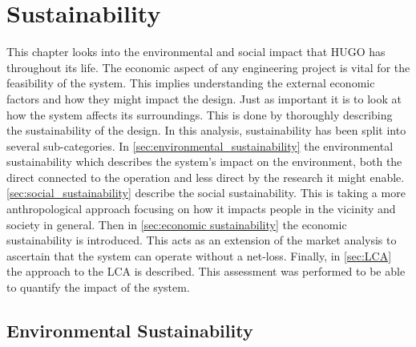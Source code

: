 \chapter{Sustainability}
\label{ch:sustainability}
 This chapter looks into the environmental and social impact that HUGO has throughout its life. The economic aspect of any engineering project is vital for the feasibility of the system. This implies understanding the external economic factors and how they might impact the design. Just as important it is to look at how the system affects its surroundings. This is done by thoroughly describing the sustainability of the design. In this analysis, sustainability has been split into several sub-categories. In \autoref{sec:environmental_sustainability} the environmental sustainability which describes the system's impact on the environment, both the direct connected to the operation and less direct by the research it might enable. \autoref{sec:social_sustainability} describe the social sustainability. This is taking a more anthropological approach focusing on how it impacts people in the vicinity and society in general. Then in \autoref{sec:economic sustainability} the economic sustainability is introduced. This acts as an extension of the market analysis to ascertain that the system can operate without a net-loss. Finally, in \autoref{sec:LCA} the approach to the LCA is described. This assessment was performed to be able to quantify the impact of the system.

 
\section{Environmental Sustainability}
\label{sec:environmental_sustainability}

